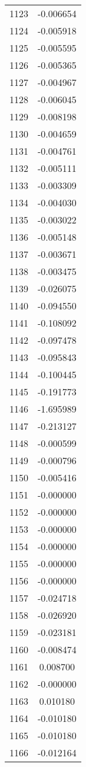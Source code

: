 \documentclass[12pt]{article}
\begin{document}
\begin{longtable}{@{}cc@{}}
1123 & -0.006654 \\
1124 & -0.005918 \\
1125 & -0.005595 \\
1126 & -0.005365 \\
1127 & -0.004967 \\
1128 & -0.006045 \\
1129 & -0.008198 \\
1130 & -0.004659 \\
1131 & -0.004761 \\
1132 & -0.005111 \\
1133 & -0.003309 \\
1134 & -0.004030 \\
1135 & -0.003022 \\
1136 & -0.005148 \\
1137 & -0.003671 \\
1138 & -0.003475 \\
1139 & -0.026075 \\
1140 & -0.094550 \\
1141 & -0.108092 \\
1142 & -0.097478 \\
1143 & -0.095843 \\
1144 & -0.100445 \\
1145 & -0.191773 \\
1146 & -1.695989 \\
1147 & -0.213127 \\
1148 & -0.000599 \\
1149 & -0.000796 \\
1150 & -0.005416 \\
1151 & -0.000000 \\
1152 & -0.000000 \\
1153 & -0.000000 \\
1154 & -0.000000 \\
1155 & -0.000000 \\
1156 & -0.000000 \\
1157 & -0.024718 \\
1158 & -0.026920 \\
1159 & -0.023181 \\
1160 & -0.008474 \\
1161 & 0.008700 \\
1162 & -0.000000 \\
1163 & 0.010180 \\
1164 & -0.010180 \\
1165 & -0.010180 \\
1166 & -0.012164 \\

\end{longtable}
\end{document}
